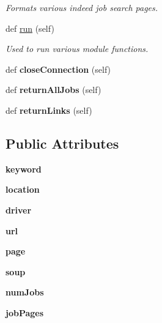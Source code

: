 \begin{DoxyCompactItemize}
\begin{DoxyCompactList}\small\item\em Formats various indeed job search pages. \end{DoxyCompactList}\item 
def \hyperlink{classindeed_1_1Indeed_ab5b7de5f85902f3d22be6bc176bc5146}{run} (self)
\begin{DoxyCompactList}\small\item\em Used to run various module functions. \end{DoxyCompactList}\item 
\mbox{\label{classindeed_1_1Indeed_a64085dd12fad5231a197181b76863dcf}} 
def {\bfseries close\+Connection} (self)
\item 
\mbox{\label{classindeed_1_1Indeed_a50f327d87fcbac76e4bb1ee5ee50770e}} 
def {\bfseries return\+All\+Jobs} (self)
\item 
\mbox{\label{classindeed_1_1Indeed_a378ae9d922a915960e44bca1e24095b5}} 
def {\bfseries return\+Links} (self)
\end{DoxyCompactItemize}
\subsection*{Public Attributes}
\begin{DoxyCompactItemize}
\item 
\mbox{\label{classindeed_1_1Indeed_a63312d10483344a3b90d9bfcd9ae49d9}} 
{\bfseries keyword}
\item 
\mbox{\label{classindeed_1_1Indeed_ac5041a83f362a4197313e997eb723e13}} 
{\bfseries location}
\item 
\mbox{\label{classindeed_1_1Indeed_ae5da0db7958124d067d2be2a8820694f}} 
{\bfseries driver}
\item 
\mbox{\label{classindeed_1_1Indeed_ad5da680b25d0e6c3bba153b31a4297a7}} 
{\bfseries url}
\item 
\mbox{\label{classindeed_1_1Indeed_a9e91077239458307d6d58d92c892dd68}} 
{\bfseries page}
\item 
\mbox{\label{classindeed_1_1Indeed_a5bfee75d4c88e686c9e12cf2a6673aaa}} 
{\bfseries soup}
\item 
\mbox{\label{classindeed_1_1Indeed_aca5dd2546e05f93b8817a2c8260baf72}} 
{\bfseries num\+Jobs}
\item 
\mbox{\label{classindeed_1_1Indeed_afdfe329fa5d2a2b86c2aff7096dd0c60}} 
{\bfseries job\+Pages}
\end{DoxyCompactItemize}
